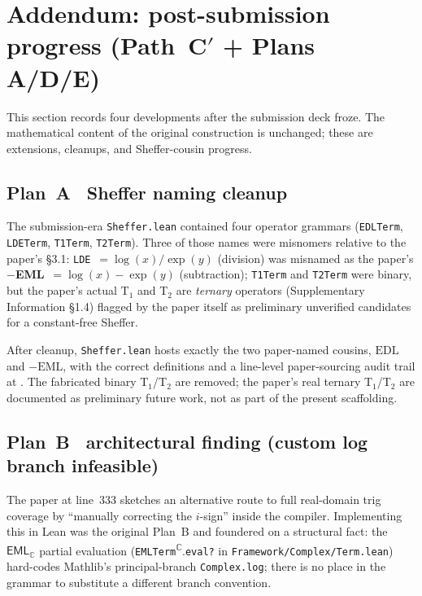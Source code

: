 \documentclass[11pt]{article}
\newcommand{\EML}{\mathsf{EML}}
\theoremstyle{plain}
\theoremstyle{definition}
\begin{document}
\section{\texorpdfstring{Addendum: post-submission progress (Path~C$'$ + Plans A/D/E)}{Addendum: post-submission progress (Path C-prime + Plans A/D/E)}}
\label{sec:post-submission}

This section records four developments after the submission deck froze.
The mathematical content of the original construction is unchanged;
these are extensions, cleanups, and Sheffer-cousin progress.

\subsection*{Plan~A \textemdash\ Sheffer naming cleanup}

The submission-era \texttt{Sheffer.lean} contained four operator
grammars (\texttt{EDLTerm}, \texttt{LDETerm},
\texttt{T1Term}, \texttt{T2Term}). Three of those names were misnomers
relative to the paper's \S3.1:
\texttt{LDE}~$=\log(x)/\exp(y)$ (division) was misnamed as the paper's
\textbf{$-$EML}~$=\log(x)-\exp(y)$ (subtraction); \texttt{T1Term} and
\texttt{T2Term} were binary, but the paper's actual T$_1$ and T$_2$ are
\emph{ternary} operators (Supplementary Information \S1.4) flagged by
the paper itself as preliminary unverified candidates for a constant-free
Sheffer.

After cleanup, \texttt{Sheffer.lean} hosts exactly the two
paper-named cousins, $\mathrm{EDL}$ and $-\mathrm{EML}$, with the
correct definitions and a line-level paper-sourcing audit trail at
.
The fabricated binary T$_1$/T$_2$ are removed; the paper's real
ternary T$_1$/T$_2$ are documented as preliminary future work, not as
part of the present scaffolding.

\subsection*{Plan~B \textemdash\ architectural finding (custom log
branch infeasible)}

The paper at line~333 sketches an alternative route to full real-domain
trig coverage by ``manually correcting the $i$-sign'' inside the
compiler. Implementing this in Lean was the original Plan~B and
foundered on a structural fact: the $\EML_{\mathbb{C}}$ partial
evaluation (\texttt{EMLTerm}\textsuperscript{$\mathbb{C}$}.\texttt{eval?}
in \texttt{Framework/Complex/Term.lean}) hard-codes Mathlib's
principal-branch \texttt{Complex.log}; there is no place in the
grammar to substitute a different branch convention.
\end{document}
